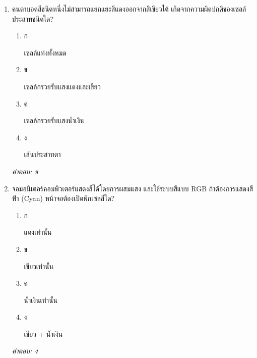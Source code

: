 \documentclass[12pt]{article}
\begin{document}
\begin{enumerate}[label=\arabic*., itemsep=0.5\baselineskip, topsep=0.5\baselineskip, leftmargin=*]
\item คนตาบอดสีชนิดหนึ่งไม่สามารถแยกแยะสีแดงออกจากสีเขียวได้ เกิดจากความผิดปกติของเซลล์ประสาทชนิดใด?
\begin{enumerate}[label=\alph*)., itemsep=0.3\baselineskip, topsep=0.3\baselineskip]
\item ก\ 
\begin{minipage}[t]{0.9\linewidth}
\raggedright เซลล์แท่งทั้งหมด
\end{minipage}
\item ข\ 
\begin{minipage}[t]{0.9\linewidth}
\raggedright เซลล์กรวยรับแสงแดงและเขียว
\end{minipage}
\item ค\ 
\begin{minipage}[t]{0.9\linewidth}
\raggedright เซลล์กรวยรับแสงน้ำเงิน
\end{minipage}
\item ง\ 
\begin{minipage}[t]{0.9\linewidth}
\raggedright เส้นประสาทตา
\end{minipage}
\end{enumerate}
\vspace{-0.3\baselineskip}
\begin{small}
\textit{คำตอบ: ข}
\end{small}

\item จอมอนิเตอร์คอมพิวเตอร์แสดงสีได้โดยการผสมแสง และใช้ระบบสีแบบ RGB ถ้าต้องการแสดงสีฟ้า (Cyan) หน้าจอต้องเปิดพิกเซลสีใด?
\begin{enumerate}[label=\alph*)., itemsep=0.3\baselineskip, topsep=0.3\baselineskip]
\item ก\ 
\begin{minipage}[t]{0.9\linewidth}
\raggedright แดงเท่านั้น
\end{minipage}
\item ข\ 
\begin{minipage}[t]{0.9\linewidth}
\raggedright เขียวเท่านั้น
\end{minipage}
\item ค\ 
\begin{minipage}[t]{0.9\linewidth}
\raggedright น้ำเงินเท่านั้น
\end{minipage}
\item ง\ 
\begin{minipage}[t]{0.9\linewidth}
\raggedright เขียว + น้ำเงิน
\end{minipage}
\end{enumerate}
\vspace{-0.3\baselineskip}
\begin{small}
\textit{คำตอบ: ง}
\end{small}


\end{enumerate}
\end{document}
